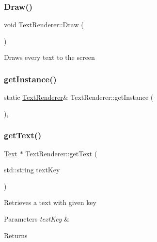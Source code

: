 \subsubsection{\texorpdfstring{Draw()}{Draw()}}
{\footnotesize\ttfamily void Text\+Renderer\+::\+Draw (\begin{DoxyParamCaption}{ }\end{DoxyParamCaption})}



Draws every text to the screen 

\mbox{\label{class_text_renderer_a94a68e46e699ba95ae64ad7bf6f8a1be}} 
\subsubsection{\texorpdfstring{get\+Instance()}{getInstance()}}
{\footnotesize\ttfamily static \mbox{\hyperlink{class_text_renderer}{Text\+Renderer}}\& Text\+Renderer\+::get\+Instance (\begin{DoxyParamCaption}{ }\end{DoxyParamCaption})\hspace{0.3cm}{\ttfamily [inline]}, {\ttfamily [static]}}

\mbox{\label{class_text_renderer_ac05aa714426b16276c45647e8c7c50bd}} 
\subsubsection{\texorpdfstring{get\+Text()}{getText()}}
{\footnotesize\ttfamily \mbox{\hyperlink{class_text}{Text}} $\ast$ Text\+Renderer\+::get\+Text (\begin{DoxyParamCaption}\item[{std\+::string}]{text\+Key }\end{DoxyParamCaption})}



Retrieves a text with given key 


\begin{DoxyParams}{Parameters}
{\em text\+Key} & \\
\hline
\end{DoxyParams}
\begin{DoxyReturn}{Returns}

\end{DoxyReturn}
\mbox{\label{class_text_renderer_a7bbce1218d00986c91ff15e5e6dfdc3a}} 
